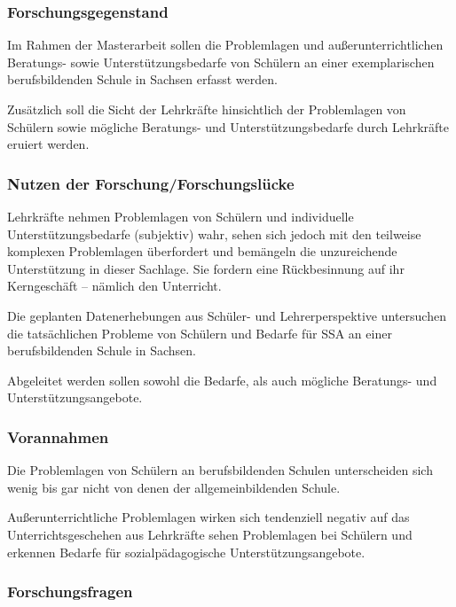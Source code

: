 \subsubsection{Forschungsgegenstand}
\label{sec:Forschungsgegenstand}

Im Rahmen der Masterarbeit sollen die Problemlagen und außerunterrichtlichen Beratungs- sowie Unterstützungsbedarfe von Schülern an einer exemplarischen berufsbildenden Schule in Sachsen erfasst werden.

Zusätzlich soll die Sicht der Lehrkräfte hinsichtlich der Problemlagen von Schülern sowie mögliche Beratungs- und Unterstützungsbedarfe durch Lehrkräfte eruiert werden.

\subsubsection{Nutzen der Forschung/Forschungslücke}
\label{sec:NutzenDerForschungForschungslücke}

Lehrkräfte nehmen Problemlagen von Schülern und individuelle Unterstützungsbedarfe (subjektiv) wahr, sehen sich jedoch mit den teilweise komplexen Problemlagen überfordert und bemängeln die unzureichende Unterstützung in dieser Sachlage. Sie fordern eine Rückbesinnung auf ihr Kerngeschäft -- nämlich den Unterricht.

Die geplanten Datenerhebungen aus Schüler- und Lehrerperspektive untersuchen die tatsächlichen Probleme von Schülern und Bedarfe für SSA an einer berufsbildenden Schule in Sachsen.

Abgeleitet werden sollen sowohl die Bedarfe, als auch mögliche Beratungs- und Unterstützungsangebote.

\subsubsection{Vorannahmen}
\label{sec:Vorannahmen}

Die Problemlagen von Schülern an berufsbildenden Schulen unterscheiden sich wenig bis gar nicht von denen der allgemeinbildenden Schule.

Außerunterrichtliche Problemlagen wirken sich tendenziell negativ auf das Unterrichtsgeschehen aus
Lehrkräfte sehen Problemlagen bei Schülern und erkennen Bedarfe für sozialpädagogische Unterstützungsangebote. 

\subsubsection{Forschungsfragen}
\label{sec:Forschungsfragen}

